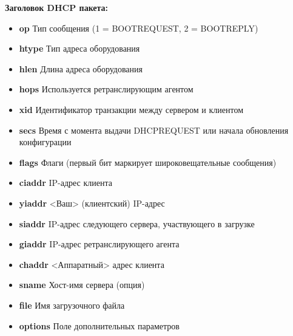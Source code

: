 \textbf{Заголовок DHCP пакета:}
\begin{itemize}
    \item \textbf{op}
    Тип сообщения (1 = BOOTREQUEST, 2 = BOOTREPLY)
    \item \textbf{htype}
    Тип адреса оборудования
    \item \textbf{hlen}
    Длина адреса оборудования
    \item \textbf{hops}
    Используется ретранслирующим агентом
    \item \textbf{xid}
    Идентификатор транзакции между сервером и клиентом
    \item \textbf{secs}
    Время с момента выдачи DHCPREQUEST или начала обновления конфигурации
    \item \textbf{flags}
    Флаги (первый бит маркирует широковещательные сообщения)
    \item \textbf{ciaddr}
    IP-адрес клиента
    \item \textbf{yiaddr}
    <Ваш> (клиентский) IP-адрес
    \item \textbf{siaddr}
    IP-адрес следующего сервера, участвующего в загрузке
    \item \textbf{giaddr}
    IP-адрес ретранслирующего агента
    \item \textbf{chaddr}
    <Аппаратный> адрес клиента
    \item \textbf{sname}
    Хост-имя сервера (опция)
    \item \textbf{file}
    Имя загрузочного файла
    \item \textbf{options}
    Поле дополнительных параметров
\end{itemize}


